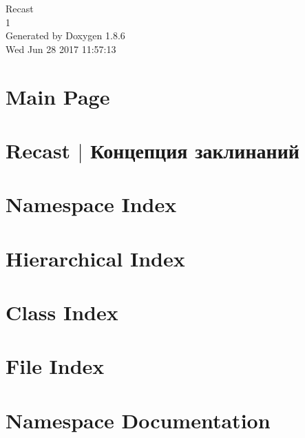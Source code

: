 \documentclass[twoside]{book}
\newcommand{\clearemptydoublepage}{%
  \newpage{\pagestyle{empty}\cleardoublepage}%
}
\begin{document}
\hypersetup{pageanchor=false}
\begin{titlepage}
\vspace*{7cm}
\begin{center}%
{\Large Recast \\[1ex]\large 1 }\\
\vspace*{1cm}
{\large Generated by Doxygen 1.8.6}\\
\vspace*{0.5cm}
{\small Wed Jun 28 2017 11:57:13}\\
\end{center}
\end{titlepage}
\clearemptydoublepage
\tableofcontents
\clearemptydoublepage
{}
\hypersetup{pageanchor=true}

\chapter{Main Page}
\label{index}\hypertarget{index}{}
\chapter{Recast $\vert$ Концепция заклинаний}
\label{md_custom-docs__nodes}
\hypertarget{md_custom-docs__nodes}{}

\chapter{Namespace Index}

\chapter{Hierarchical Index}

\chapter{Class Index}

\chapter{File Index}

\chapter{Namespace Documentation}





\end{document}
